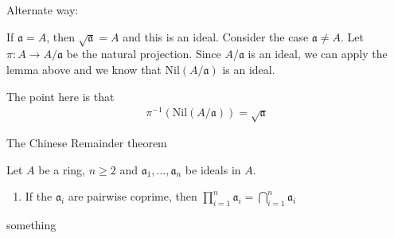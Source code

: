 \documentclass{book}
\theoremstyle{custom_definition}
\begin{document}
    Alternate way:

    If \(\mathfrak{a} = A\), then \(\sqrt{\mathfrak{a}} = A\) and this is an ideal. Consider the case \(\mathfrak{a} \neq A\). Let \(\pi: A \longrightarrow A / \mathfrak{a}\) be the natural projection. Since \(A / \mathfrak{a}\) is an ideal, we can apply the lemma above and we know that \(\text{Nil}(A / \mathfrak{a})\) is an ideal.

    The point here is that
    \begin{align}
        \pi^{-1} (\text{Nil}(A / \mathfrak{a})) = \sqrt{\mathfrak{a}}
    \end{align}


    The Chinese Remainder theorem

    Let \(A\) be a ring, \(n \geq 2\) and \(\mathfrak{a}_1, \ldots, \mathfrak{a}_n\) be ideals in \(A\).
    \begin{enumerate}
        \item If the \(\mathfrak{a}_i\) are pairwise coprime, then \(\prod_{i=1}^n \mathfrak{a}_i = \bigcap_{i=1}^n \mathfrak{a}_i\)
    \end{enumerate}
    something
\end{document}
